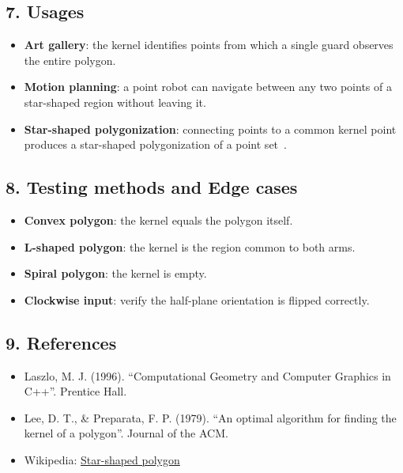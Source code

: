 \subsection{7. Usages}
\begin{itemize}
    \item \textbf{Art gallery}: the kernel identifies points from which a single guard observes the entire polygon.
    \item \textbf{Motion planning}: a point robot can navigate between any two points of a star-shaped region without leaving it.
    \item \textbf{Star-shaped polygonization}: connecting points to a common kernel point produces a star-shaped polygonization of a point set~\cite{laszlo1996}.
\end{itemize}

\subsection{8. Testing methods and Edge cases}
\begin{itemize}
    \item \textbf{Convex polygon}: the kernel equals the polygon itself.
    \item \textbf{L-shaped polygon}: the kernel is the region common to both arms.
    \item \textbf{Spiral polygon}: the kernel is empty.
    \item \textbf{Clockwise input}: verify the half-plane orientation is flipped correctly.
\end{itemize}

\subsection{9. References}
\begin{itemize}
    \item Laszlo, M. J. (1996). ``Computational Geometry and Computer Graphics in C++''. Prentice Hall.
    \item Lee, D. T., \& Preparata, F. P. (1979). ``An optimal algorithm for finding the kernel of a polygon''. Journal of the ACM.
    \item Wikipedia: \href{https://en.wikipedia.org/wiki/Star-shaped_polygon}{Star-shaped polygon}
\end{itemize}

